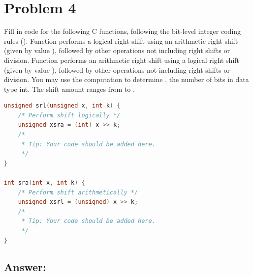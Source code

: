 
\section*{Problem 4}
\label{p4}

Fill in code for the following C functions, following the bit-level integer coding rules (). 
Function  performs a logical right shift using an arithmetic right shift (given by value ), followed by other operations not including right shifts or division. 
Function  performs an arithmetic right shift using a logical right shift (given by value ), followed by other operations not including right shifts or division. 
You may use the computation  to determine , the number of bits in data type int. 
The shift amount  ranges from  to . 

\begin{lstlisting}[frame=tb, language=C++]
unsigned srl(unsigned x, int k) {
    /* Perform shift logically */
    unsigned xsra = (int) x >> k;
    /*
     * Tip: Your code should be added here. 
     */
}
    
int sra(int x, int k) {
    /* Perform shift arithmetically */
    unsigned xsrl = (unsigned) x >> k;
    /*
     * Tip: Your code should be added here. 
     */
}
\end{lstlisting}

\subsection*{Answer:}
